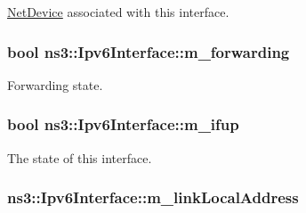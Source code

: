 \hyperlink{classns3_1_1NetDevice}{Net\+Device} associated with this interface. 

\subsubsection[{\texorpdfstring{m\+\_\+forwarding}{m_forwarding}}]{\setlength{\rightskip}{0pt plus 5cm}bool ns3\+::\+Ipv6\+Interface\+::m\+\_\+forwarding\hspace{0.3cm}{\ttfamily [private]}}\hypertarget{classns3_1_1Ipv6Interface_a693503dceba1136651d29ef49c4bdff2}{}\label{classns3_1_1Ipv6Interface_a693503dceba1136651d29ef49c4bdff2}


Forwarding state. 

\subsubsection[{\texorpdfstring{m\+\_\+ifup}{m_ifup}}]{\setlength{\rightskip}{0pt plus 5cm}bool ns3\+::\+Ipv6\+Interface\+::m\+\_\+ifup\hspace{0.3cm}{\ttfamily [private]}}\hypertarget{classns3_1_1Ipv6Interface_a2073e2a90ea57f20b49562ccd917b713}{}\label{classns3_1_1Ipv6Interface_a2073e2a90ea57f20b49562ccd917b713}


The state of this interface. 

\subsubsection[{\texorpdfstring{m\+\_\+link\+Local\+Address}{m_linkLocalAddress}}]{ ns3\+::\+Ipv6\+Interface\+::m\+\_\+link\+Local\+Address\hspace{0.3cm}{\ttfamily [private]}}\hypertarget{classns3_1_1Ipv6Interface_ab726d86b96feb17cf53c165d7062c4e2}{}\label{classns3_1_1Ipv6Interface_ab726d86b96feb17cf53c165d7062c4e2}


